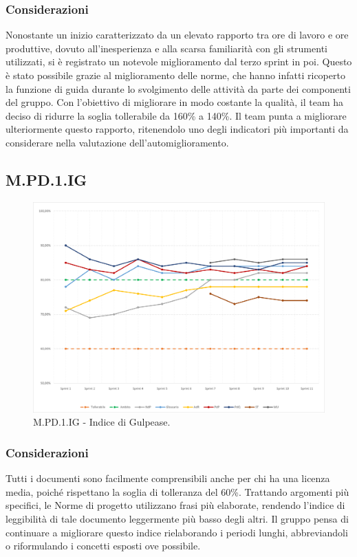 \documentclass[10pt, a4paper]{article}
\begin{document}
\subsubsection{Considerazioni}
Nonostante un inizio caratterizzato da un elevato rapporto tra ore di lavoro e ore produttive, dovuto all'inesperienza e alla scarsa familiarità con gli strumenti utilizzati, si è registrato un notevole miglioramento dal terzo sprint in poi.
Questo è stato possibile grazie al miglioramento delle norme, che hanno infatti ricoperto la funzione di guida durante lo svolgimento delle attività da parte dei componenti del gruppo.
Con l'obiettivo di migliorare in modo costante la qualità, il team ha deciso di ridurre la soglia tollerabile da 160\% a 140\%.
Il team punta a migliorare ulteriormente questo rapporto, ritenendolo uno degli indicatori più importanti da considerare nella valutazione dell'automiglioramento.
\subsection{M.PD.1.IG}
\begin{figure}[H]
\includegraphics[width=15.5cm]{img/metriche/MPD1IG.png}
\caption{M.PD.1.IG - Indice di Gulpease.}
\end{figure}
\subsubsection{Considerazioni}
Tutti i documenti sono facilmente comprensibili anche per chi ha una licenza media, poiché rispettano la soglia di tolleranza del 60\%.
Trattando argomenti più specifici, le Norme di progetto utilizzano frasi più elaborate, rendendo l'indice di leggibilità di tale documento leggermente più basso degli altri.
Il gruppo pensa di continuare a migliorare questo indice rielaborando i periodi lunghi, abbreviandoli o riformulando i concetti esposti ove possibile.
\end{document}
